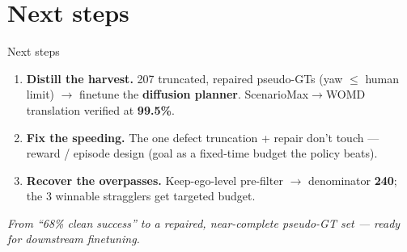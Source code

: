 \section{Next steps}

\begin{frame}{Next steps}
  \begin{enumerate}
    \item \textbf{Distill the harvest.} 207 truncated, repaired pseudo-GTs (yaw $\leq$ human limit)
          $\rightarrow$ finetune the \textbf{diffusion planner}. ScenarioMax$\to$WOMD translation
          verified at \textbf{99.5\%}.
    \item \textbf{Fix the speeding.} The one defect truncation + repair don't touch ---
          reward / episode design (goal as a fixed-time budget the policy beats).
    \item \textbf{Recover the overpasses.} Keep-ego-level pre-filter $\rightarrow$ denominator
          \textbf{240}; the 3 winnable stragglers get targeted budget.
  \end{enumerate}

  \vspace{0.6em}
  \centering
  \textit{From ``68\% clean success'' to a repaired, near-complete pseudo-GT set ---
  ready for downstream finetuning.}
\end{frame}
